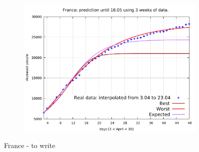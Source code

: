 \documentclass[8pt]{article}
\begin{document}
\begin{figure}[h!]
\begin{subfigure}[b]{0.45\linewidth}
  \includegraphics[width=\linewidth]{../simulations/fr/3-23/3-23.pdf}
  \end{subfigure}
	\caption{France - to write}
\end{figure}
\end{document}
